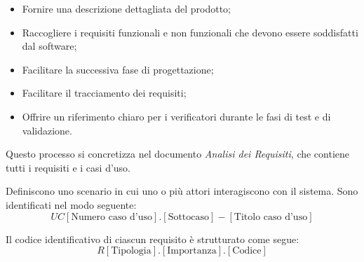         \begin{itemize}
            \item Fornire una descrizione dettagliata del prodotto;
            \item Raccogliere i requisiti funzionali e non funzionali che devono essere soddisfatti dal software;
            \item Facilitare la successiva fase di progettazione;
            \item Facilitare il tracciamento dei requisiti;
            \item Offrire un riferimento chiaro per i verificatori durante le fasi di test e di validazione.
        \end{itemize}

        Questo processo si concretizza nel documento \textit{Analisi dei Requisiti}, 
        che contiene tutti i requisiti e i casi d'uso.
        
        Definiscono uno scenario in cui uno o più attori interagiscono con il sistema. Sono
        identificati nel modo seguente:
        \textbf{
        \[
        UC[\text{Numero caso d'uso}].[\text{Sottocaso}] - [\text{Titolo caso d'uso}]
        \]
        }
        
         \vspace{1em}
         Il codice identificativo di ciascun requisito è strutturato come segue:
        \textbf{
        \[
        R[\text{Tipologia}].[ \text{Importanza}].[ \text{Codice}]
        \]
        }
        
